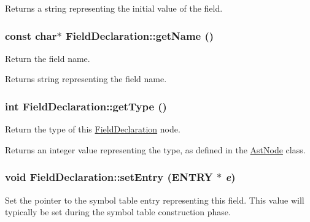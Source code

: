 \begin{DoxyReturn}{Returns}
a string representing the initial value of the field. 
\end{DoxyReturn}
\hypertarget{classFieldDeclaration_a132a85e17482895ac3af743eca97b2c4}{
\subsubsection[{getName}]{\setlength{\rightskip}{0pt plus 5cm}const char$\ast$ FieldDeclaration::getName ()}}
\label{classFieldDeclaration_a132a85e17482895ac3af743eca97b2c4}
Return the field name.

\begin{DoxyReturn}{Returns}
string representing the field name. 
\end{DoxyReturn}
\hypertarget{classFieldDeclaration_af7bf6c60c56fbe7e8e27e470fb6ff870}{
\subsubsection[{getType}]{\setlength{\rightskip}{0pt plus 5cm}int FieldDeclaration::getType ()}}
\label{classFieldDeclaration_af7bf6c60c56fbe7e8e27e470fb6ff870}
Return the type of this \hyperlink{classFieldDeclaration}{FieldDeclaration} node.

\begin{DoxyReturn}{Returns}
an integer value representing the type, as defined in the \hyperlink{classAstNode}{AstNode} class. 
\end{DoxyReturn}
\hypertarget{classFieldDeclaration_a0220f27540af855ca7c7803728926fb5}{
\subsubsection[{setEntry}]{\setlength{\rightskip}{0pt plus 5cm}void FieldDeclaration::setEntry (ENTRY $\ast$ {\em e})}}
\label{classFieldDeclaration_a0220f27540af855ca7c7803728926fb5}
Set the pointer to the symbol table entry representing this field. This value will typically be set during the symbol table construction phase.


